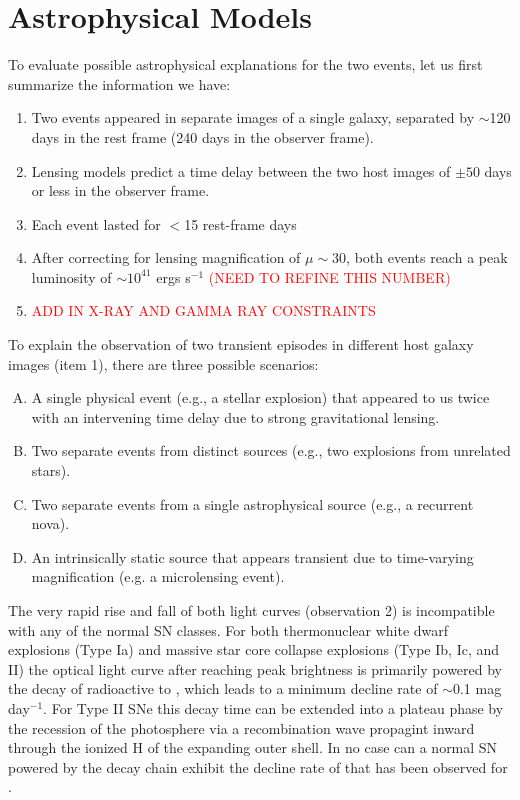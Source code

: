 \section{Astrophysical Models}

To evaluate possible astrophysical explanations for the two \spock
events, let us first summarize the information we have:

\begin{enumerate}
\item{Two events appeared in separate images of a single galaxy,
  separated by $\sim$120 days in the rest frame (240 days in the
  observer frame). \label{itm:TwoEvents}}
\item{Lensing models predict a time delay between the two host images
  of $\pm50$ days or less in the observer frame.}
\item{Each event lasted for $<$15 rest-frame days\label{itm:FastLC}}
\item{After correcting for lensing magnification of $\mu\sim30$, both
  events reach a peak luminosity of $\sim10^{41}$ ergs s$^{-1}$
  \textcolor{red}{(NEED TO REFINE THIS NUMBER)}}
\item{\textcolor{red}{ADD IN X-RAY AND GAMMA RAY CONSTRAINTS}}
\end{enumerate}

To explain the observation of two transient episodes in different host
galaxy images (item 1), there are three possible
scenarios:

\begin{enumerate}[(A)]
\item{A single physical event (e.g., a stellar explosion) that
  appeared to us twice with an intervening time delay due to strong
  gravitational lensing.}
\item{Two separate events from distinct sources (e.g., two explosions
  from unrelated stars).}
\item{Two separate events from a single astrophysical source (e.g., a
  recurrent nova).}
\item{An intrinsically static source that appears transient due to time-varying magnification (e.g. a microlensing event).}
\end{enumerate}

The very rapid rise and fall of both light curves (observation 2)
is incompatible with any of the normal SN classes.  For both
thermonuclear white dwarf explosions (Type Ia) and massive star core
collapse explosions (Type Ib, Ic, and II) the optical light curve
after reaching peak brightness is primarily powered by the decay of
radioactive \NiFiftySix to \CoFiftySix, which leads to a minimum
decline rate of $\sim$0.1 mag day$^{-1}$.  For Type II SNe this decay
time can be extended into a plateau phase by the recession of the
photosphere via a recombination wave propagint inward through the
ionized H of the expanding outer shell.  In no case can a normal SN
powered by the \NiFiftySix decay chain exhibit the decline rate of
 that has
been observed for \spock.

